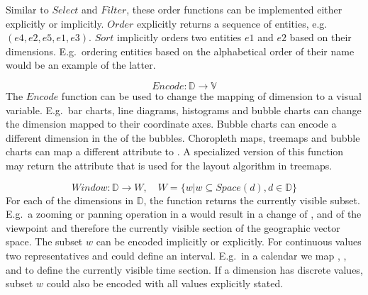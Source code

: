   Similar to $Select$ and $Filter$, these order functions can be implemented either explicitly or implicitly.
  $Order$ explicitly returns a sequence of entities, e.g.\ $(e4, e2, e5, e1, e3)$.
  $Sort$ implicitly orders two entities $e1$ and $e2$ based on their dimensions.
  E.g.\ ordering entities based on the alphabetical order of their name would be an example of the latter.

\begin{equation} Encode: \mathbb{D} \rightarrow \mathbb{V} \end{equation}
  The $Encode$ function can be used to change the mapping of dimension to a visual variable.
  E.g.\ bar charts, line diagrams, histograms and bubble charts can change the dimension mapped to their coordinate axes.
  Bubble charts can encode a different dimension in the  of the bubbles.
  Choropleth maps, treemaps and bubble charts can map a different attribute to .
  A specialized version of this function may return the attribute that is used for the layout algorithm in treemaps.

\begin{equation} Window: \mathbb{D} \rightarrow W, \quad W = \{w | w \subseteq Space(d), d \in \mathbb{D}\} \end{equation}
  For each of the dimensions in $\mathbb{D}$, the function returns the currently visible subset.
  E.g.\ a zooming or panning operation in a \gv{} would result in a change of ,  and  of the viewpoint and therefore the currently visible section of the geographic vector space.
  The subset $w$ can be encoded implicitly or explicitly.
  For continuous values two representatives  and  could define an interval.
  E.g.\ in a calendar we map , ,  and  to define the currently visible time section.
  If a dimension has discrete values, subset $w$ could also be encoded with all values explicitly stated.







